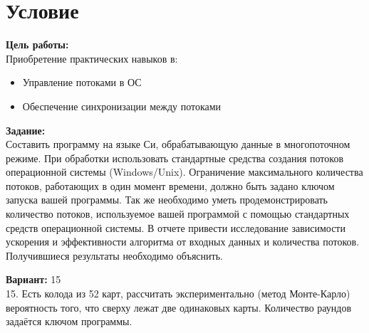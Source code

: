 \section{Условие}

{\bfseries Цель работы:} \\
Приобретение практических навыков в:
\begin{itemize}
\item Управление потоками в ОС
\item Обеспечение синхронизации между потоками
\end{itemize}

{\bfseries Задание:} \\
Составить программу на языке Си, обрабатывающую данные в многопоточном режиме. При обработки использовать стандартные средства создания потоков операционной системы (Windows/Unix). Ограничение максимального количества потоков, работающих в один момент времени, должно быть задано ключом запуска вашей программы.
Так же необходимо уметь продемонстрировать количество потоков, используемое вашей программой с помощью стандартных средств операционной системы.
В отчете привести исследование зависимости ускорения и эффективности алгоритма от входных данных и количества потоков. Получившиеся результаты необходимо объяснить.

{\bfseries Вариант:} 15 \\
15.	Есть колода из 52 карт, рассчитать экспериментально (метод Монте-Карло) вероятность того, что сверху лежат две одинаковых карты. Количество раундов задаётся ключом программы.
\pagebreak